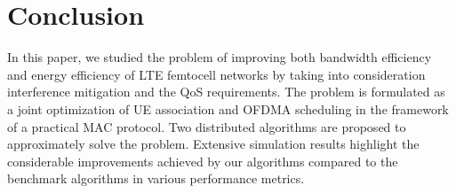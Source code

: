\documentclass[conference]{IEEEtran}
\begin{document}
\section{Conclusion}\label{conclution}

In this paper, we studied the problem of improving both bandwidth efficiency and energy efficiency of LTE femtocell networks by taking into consideration interference mitigation and the QoS requirements. The problem is formulated as a joint optimization of UE association and OFDMA scheduling in the framework of a practical MAC protocol. Two distributed algorithms are proposed to approximately solve the problem. Extensive simulation results highlight the considerable improvements achieved by our algorithms compared to the benchmark algorithms in various performance metrics. 















\end{document}
